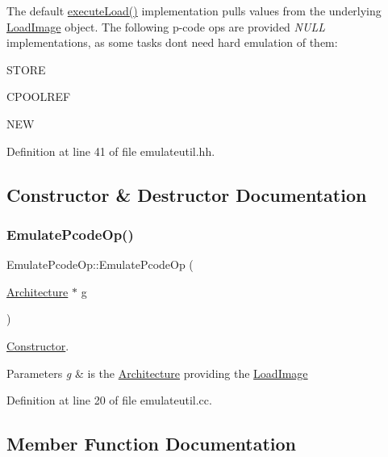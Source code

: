 The default \mbox{\hyperlink{class_emulate_pcode_op_ab665b04ab8db4b7025e1a5b6a05189ea}{execute\+Load()}} implementation pulls values from the underlying \mbox{\hyperlink{class_load_image}{Load\+Image}} object. The following p-\/code ops are provided {\itshape N\+U\+LL} implementations, as some tasks don\textquotesingle{}t need hard emulation of them\+:
\begin{DoxyItemize}
\item S\+T\+O\+RE
\item C\+P\+O\+O\+L\+R\+EF
\item N\+EW 
\end{DoxyItemize}

Definition at line 41 of file emulateutil.\+hh.



\subsection{Constructor \& Destructor Documentation}
\mbox{\label{class_emulate_pcode_op_aa09cc9bcd0f6a983c4410d2c6137c002}} 
\subsubsection{\texorpdfstring{EmulatePcodeOp()}{EmulatePcodeOp()}}
{\footnotesize\ttfamily Emulate\+Pcode\+Op\+::\+Emulate\+Pcode\+Op (\begin{DoxyParamCaption}\item[{\mbox{\hyperlink{class_architecture}{Architecture}} $\ast$}]{g }\end{DoxyParamCaption})}



\mbox{\hyperlink{class_constructor}{Constructor}}. 


\begin{DoxyParams}{Parameters}
{\em g} & is the \mbox{\hyperlink{class_architecture}{Architecture}} providing the \mbox{\hyperlink{class_load_image}{Load\+Image}} \\
\hline
\end{DoxyParams}


Definition at line 20 of file emulateutil.\+cc.



\subsection{Member Function Documentation}
\mbox{\label{class_emulate_pcode_op_ac33f956b6cf8b205b32324d0a84b38cb}} 
